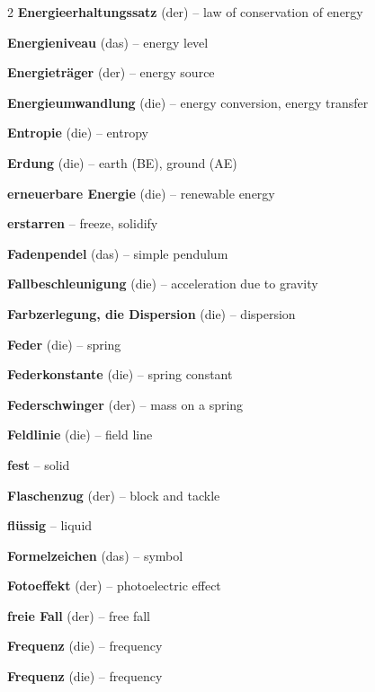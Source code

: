 \begin{multicols}{2}
\textbf{Energieerhaltungssatz} (der) -- law of conservation of energy\dotfill\hyperref[e:104]{\pageref*{e:104}}\par
\textbf{Energieniveau} (das) -- energy level\dotfill\hyperref[e:294]{\pageref*{e:294}}\par
\textbf{Energieträger} (der) -- energy source\dotfill\hyperref[e:109]{\pageref*{e:109}}\par
\textbf{Energieumwandlung} (die) -- energy conversion, energy transfer\dotfill\hyperref[e:103]{\pageref*{e:103}}\par
\textbf{Entropie} (die) -- entropy\dotfill\hyperref[e:142]{\pageref*{e:142}}\par
\textbf{Erdung} (die) -- earth (BE), ground (AE)\dotfill\hyperref[e:189]{\pageref*{e:189}}\par
\textbf{erneuerbare Energie} (die) -- renewable energy\dotfill\hyperref[e:110]{\pageref*{e:110}}\par
\textbf{erstarren} -- freeze, solidify\dotfill\hyperref[e:130]{\pageref*{e:130}}\par

\par\nopagebreak
\textbf{Fadenpendel} (das) -- simple pendulum\dotfill\hyperref[e:191]{\pageref*{e:191}}\par
\textbf{Fallbeschleunigung} (die) -- acceleration due to gravity\dotfill\hyperref[e:47]{\pageref*{e:47}}\par
\textbf{Farbzerlegung, die Dispersion} (die) -- dispersion\dotfill\hyperref[e:256]{\pageref*{e:256}}\par
\textbf{Feder} (die) -- spring\dotfill\hyperref[e:70]{\pageref*{e:70}}\par
\textbf{Federkonstante} (die) -- spring constant\dotfill\hyperref[e:72]{\pageref*{e:72}}\par
\textbf{Federschwinger} (der) -- mass on a spring\dotfill\hyperref[e:192]{\pageref*{e:192}}\par
\textbf{Feldlinie} (die) -- field line\dotfill\hyperref[e:173]{\pageref*{e:173}}\par
\textbf{fest} -- solid\dotfill\hyperref[e:126]{\pageref*{e:126}}\par
\textbf{Flaschenzug} (der) -- block and tackle\dotfill\hyperref[e:87]{\pageref*{e:87}}\par
\textbf{flüssig} -- liquid\dotfill\hyperref[e:127]{\pageref*{e:127}}\par
\textbf{Formelzeichen} (das) -- symbol\dotfill\hyperref[e:6]{\pageref*{e:6}}\par
\textbf{Fotoeffekt} (der) -- photoelectric effect\dotfill\hyperref[e:293]{\pageref*{e:293}}\par
\textbf{freie Fall} (der) -- free fall\dotfill\hyperref[e:46]{\pageref*{e:46}}\par
\textbf{Frequenz} (die) -- frequency\dotfill\hyperref[e:52]{\pageref*{e:52}}\par
\textbf{Frequenz} (die) -- frequency\dotfill\hyperref[e:197]{\pageref*{e:197}}\par


\end{multicols}
